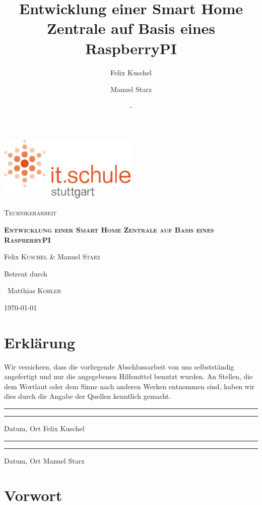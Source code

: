 \documentclass[12pt,a4paper]{article}
\author{Felix Kuschel
	\and Manuel Starz}
\title{Entwicklung einer Smart Home Zentrale auf Basis eines RaspberryPI}
\date{-}
\begin{document}
	\begin{titlepage}
		\centering
		\includegraphics[width=0.5\textwidth]{its_logo.pdf}\par\vspace{1cm}
		\vspace{1cm}
		{\scshape\Large Technikerarbeit\par}
		\vspace{1.5cm}
		{\huge\bfseries\scshape Entwicklung einer Smart Home Zentrale auf Basis eines RaspberryPI\par}
		\vspace{2cm}
		{\Large Felix \textsc{Kuschel} \& Manuel \textsc{Starz}\par}
		\vfill
		Betreut durch\par
		~Matthias \textsc{Kohler}

		\vfill

		{\large \today\par}
	\end{titlepage}
	\tableofcontents
	\newpage
	\section*{Erklärung}
	Wir versichern, dass die vorliegende Abschlussarbeit von uns selbstständig angefertigt und nur die angegebenen Hilfsmittel benutzt wurden. An Stellen, die dem Wortlaut oder dem Sinne nach anderen Werken entnommen sind, haben wir dies durch die Angabe der Quellen kenntlich gemacht.
	\vspace{2cm}	
	\\
	\noindent\rule{7cm}{.4pt}\hfill\rule{7cm}{.4pt}\par
	\noindent Datum, Ort \hfill Felix Kuschel
	\vspace{2cm}	
	\\
	\noindent\rule{7cm}{.4pt}\hfill\rule{7cm}{.4pt}\par
	\noindent Datum, Ort \hfill Manuel Starz
	\newpage
	\section{Vorwort}
\end{document}

